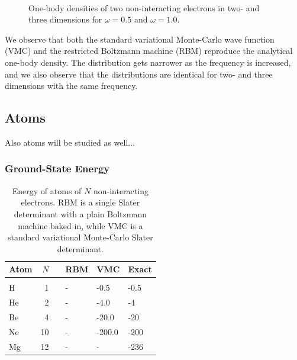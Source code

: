 \begin{figure} [h]%
	\centering
	\\
	
	\caption{One-body densities of two non-interacting electrons in two- and three dimensions for $\omega=0.5$ and $\omega=1.0$.}%
	\label{fig:OB_nointeraction}
\end{figure}

We observe that both the standard variational Monte-Carlo wave function (VMC) and the restricted Boltzmann machine (RBM) reproduce the analytical one-body density. The distribution gets narrower as the frequency is increased, and we also observe that the distributions are identical for two- and three dimensions with the same frequency.

\newpage
\subsection{Atoms}
Also atoms will be studied as well...

\subsubsection{Ground-State Energy}
\begin{table} [H]
	\caption{Energy of atoms of $N$ non-interacting electrons. RBM is a single Slater determinant with a plain Boltzmann machine baked in, while VMC is a standard variational Monte-Carlo Slater determinant.}
	\label{tab:atomswointeraction}
	\begin{tabularx}{\textwidth}{lrrR{3.5cm}R{3.5cm}R{3.5cm}} \hline\hline
		Atom & $N$ & \makecell{\\ \phantom{=}} & RBM & VMC & Exact \\ \hline \\
		
		H & 1 && - & -0.5 & -0.5 \\
		He & 2 && - & -4.0 & -4 \\
		Be & 4 && - & -20.0 & -20 \\
		Ne & 10 && - & -200.0 & -200\\
		Mg & 12 && - & - & -236 \\ \hline\hline
	\end{tabularx}
\end{table}

